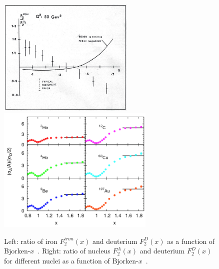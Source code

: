 \begin{figure}[!ht]
  \centering
  \includegraphics[width=6.5cm]{FigCap2/EMC.jpg}
  \includegraphics[width=7.5cm]{FigCap2/EMC2.png}
  \caption{Left: ratio of iron $F^{iron}_2(x)$ and deuterium $F^D_2(x)$ as a function of Bjorken-$x$~\cite{Aubert:1983xm}. Right: ratio of nucleus $F^{A}_2(x)$ and deuterium $F^D_2(x)$ for different nuclei as a function of Bjorken-$x$~\cite{Seely:2009gt}.}
  \label{fig:EMC}
\end{figure}



